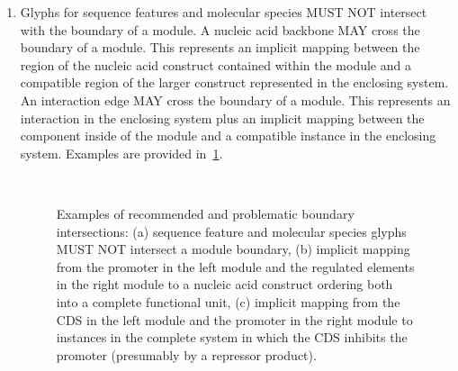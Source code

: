 {\begin{enumerate}
\item Glyphs for sequence features and molecular species MUST NOT intersect with the boundary of a module.
	A nucleic acid backbone MAY cross the boundary of a module. This represents an implicit mapping between the region of the nucleic acid construct contained within the module and a compatible region of the larger construct represented in the enclosing system.
	An interaction edge MAY cross the boundary of a module. This represents an interaction in the enclosing system plus an implicit mapping between the component inside of the module and a compatible instance in the enclosing system.
	Examples are provided in~\ref{exa:moduleC}.

	\begin{figure}[h!]
	\centering
	\\
	\caption{Examples of recommended and problematic boundary intersections: (a) sequence feature and molecular species glyphs MUST NOT intersect a module boundary, (b) implicit mapping from the promoter in the left module and the regulated elements in the right module to a nucleic acid construct ordering both into a complete functional unit, (c) implicit mapping from the CDS in the left module and the promoter in the right module to instances in the complete system in which the CDS inhibits the promoter (presumably by a repressor product).}
	\label{exa:moduleC}
	\end{figure}



\end{enumerate}}
